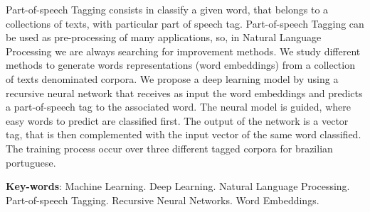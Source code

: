 \begin{resumo}[Abstract]
 
Part-of-speech Tagging consists in classify a given word, that belongs to a collections of texts, with particular part of speech tag. Part-of-speech Tagging can be used as pre-processing of many applications, so, in Natural Language Processing we are always searching for improvement methods. We study different methods to generate words representations (word embeddings) from a collection of texts denominated corpora. We propose a deep learning model by using a recursive neural network that receives as input the word embeddings and predicts a part-of-speech tag to the associated word. The neural model is guided, where easy words to predict are classified first. The output of the network is a vector tag, that is then complemented with the input vector of the same word classified. The training process occur over three different tagged corpora for brazilian portuguese.

 \vspace{\onelineskip}
 
 \noindent 
 \textbf{Key-words}: Machine Learning. Deep Learning. Natural Language Processing. Part-of-speech Tagging. Recursive Neural Networks. Word Embeddings.
\end{resumo}
